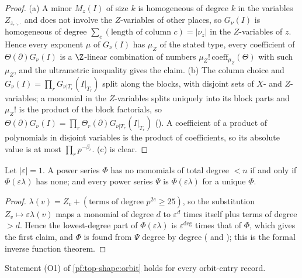 \begin{proof}
(a) A minor $M_z(I)$ of size $k$ is homogeneous of degree $k$ in the variables $Z_{z,\cdot,\cdot}$ and does not involve
the $Z$-variables of other places, so $G_\nu(I)$ is homogeneous of degree $\sum_c(\text{length of column }c)=|\nu_z|$ in
the $Z$-variables of $z$. Hence every exponent $\mu$ of $G_\nu(I)$ has $\mu_Z$ of the stated type, every coefficient of
$\Theta(\partial)G_\nu(I)$ is a $\Z$-linear combination of numbers $\mu_Z!\,\mathrm{coeff}_{\mu_Z}(\Theta)$ with such $\mu_Z$,
and the ultrametric inequality gives the claim. (b) The column choice and $G_\nu(I)=\prod_rG_{\nu|T_r}(I|_{T_r})$ split
along the blocks, with disjoint sets of $X$- and $Z$-variables; a monomial in the $Z$-variables splits uniquely into its
block parts and $\mu_Z!$ is the product of the block factorials, so $\Theta(\partial)G_\nu(I)=\prod_r\Theta_r(\partial)
G_{\nu|T_r}(I|_{T_r})$ (). A coefficient of a product of polynomials in disjoint
variables is the product of coefficients, so its absolute value is at most $\prod_rp^{-\beta_r}$. (c) is clear.
\end{proof}

\begin{lemma}\label{pf:top-shape:tri}
Let $|\varepsilon|=1$. A power series $\Phi$ has no monomials of total degree $<n$ if and only if $\Phi(\varepsilon\lambda)$
has none; and every power series $\Psi$ is $\Phi(\varepsilon\lambda)$ for a unique $\Phi$.
\end{lemma}

\begin{proof}
$\lambda(v)=Z_v+(\text{terms of degree }p^{2e}\ge25)$, so the substitution $Z_v\mapsto\varepsilon\lambda(v)$ maps a monomial
of degree $d$ to $\varepsilon^d$ times itself plus terms of degree $>d$. Hence the lowest-degree part of
$\Phi(\varepsilon\lambda)$ is $\varepsilon^{\deg}$ times that of $\Phi$, which gives the first claim, and $\Phi$ is found from
$\Psi$ degree by degree ( and ); this is the formal
inverse function theorem.
\end{proof}

\begin{proposition}\label{pf:top-shape:o1}
Statement (O1) of \cref{pf:top-shape:orbit} holds for every orbit-entry record.
\end{proposition}

